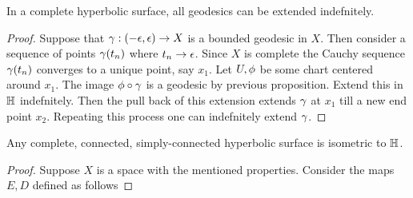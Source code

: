 \begin{theorem}
  In a complete hyperbolic surface, all geodesics can be extended indefnitely.
\end{theorem}
\begin{proof}
  Suppose that $\gamma: (-\epsilon, \epsilon)\to X$ is a bounded geodesic in $X$. Then consider a sequence of points $\gamma(t_n)$ where $t_n \to \epsilon$. Since $X$ is complete the Cauchy sequence $\gamma(t_n)$ converges to a unique point, say $x_1$. Let $U,\phi$ be some chart centered around $x_1$. The image $\phi\circ \gamma$ is a geodesic by previous proposition. Extend this in $\mathbb{H}$ indefnitely. Then the pull back of this extension extends $\gamma$ at $x_1$ till a new end point $x_2$. Repeating this process one can indefnitely extend $\gamma$.
\end{proof}
\begin{theorem}
  Any complete, connected, simply-connected hyperbolic surface is isometric to $\mathbb{H}$.
\end{theorem}
\begin{proof}
  Suppose $X$ is a space with the mentioned properties. Consider the maps $E,D$ defined as follows
\end{proof}
